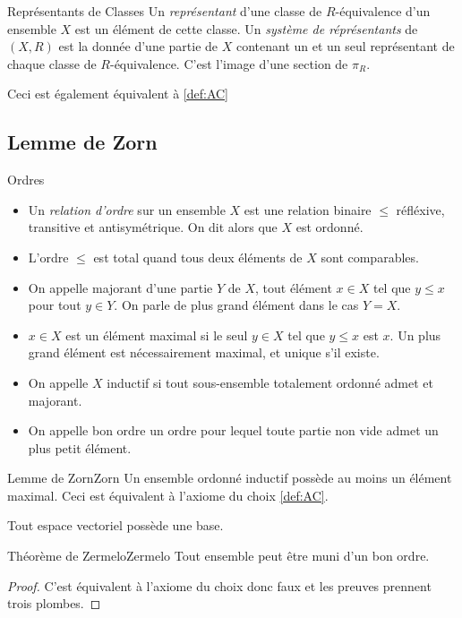 \documentclass{cours}
\begin{document}
\begin{définition}{Représentants de Classes}{}
    Un \emph{représentant} d'une classe de $R$-équivalence d'un ensemble $X$ est un élément de cette classe. Un \emph{système de réprésentants} de $\left(X, R\right)$ est la donnée d'une partie de $X$ contenant un et un seul représentant de chaque classe de $R$-équivalence. C'est l'image d'une section de $\pi_{R}$.
\end{définition}
\begin{remark}
    Ceci est également équivalent à \ref{def:AC}
\end{remark}

\subsection{Lemme de Zorn}
\begin{définition}{Ordres}{}
    \begin{itemize}
        \item Un \emph{relation d'ordre} sur un ensemble $X$ est une relation binaire $\leq$ réfléxive, transitive et antisymétrique. On dit alors que $X$ est ordonné.
        \item L'ordre $\leq$ est total quand tous deux éléments de $X$ sont comparables.
        \item On appelle majorant d'une partie $Y$ de $X$, tout élément $x \in X$ tel que $y \leq x$ pour tout $y \in Y$. On parle de plus grand élément dans le cas $Y = X$.
        \item $x \in X$ est un élément maximal si le seul $y \in X$ tel que $y \leq x$ est $x$. Un plus grand élément est nécessairement maximal, et unique s'il existe.
        \item On appelle $X$ inductif si tout sous-ensemble totalement ordonné admet et majorant.
        \item On appelle bon ordre un ordre pour lequel toute partie non vide admet un plus petit élément.
    \end{itemize}
\end{définition}

\begin{théorème}{Lemme de Zorn}{Zorn}
    Un ensemble ordonné inductif possède au moins un élément maximal. Ceci est équivalent à l'axiome du choix \ref{def:AC}.
\end{théorème}
\begin{corollaire}{}{}
    Tout espace vectoriel possède une base.
\end{corollaire}
\begin{corollaire}{Théorème de Zermelo}{Zermelo}
    Tout ensemble peut être muni d'un bon ordre.
\end{corollaire}
\begin{proof}
    C'est équivalent à l'axiome du choix donc faux et les preuves prennent trois plombes.
\end{proof}
\end{document}
